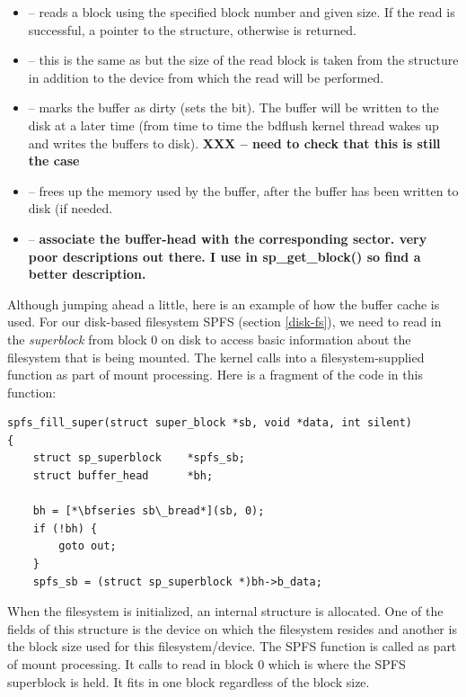 \begin{itemize}
	\item {} -- reads a block using the specified block number and given size. If the read is successful, 
		a pointer to the   structure, otherwise  is returned.
	\item {} -- this is the same as  but the size of the read block 
		is taken from the  structure in addition to the device from which the read will be performed.
	\item {} -- marks the buffer as dirty (sets the  bit). The buffer will be written 
		to the disk at a later time (from time to time the bdflush kernel thread wakes up and writes the buffers 
		to disk). \textbf{XXX -- need to check that this is still the case}
	\item {} --  frees up the memory used by the buffer, after the buffer has been written to disk 
		(if needed.
	\item {} -- \textbf{associate the buffer-head with the corresponding sector. very poor descriptions out there.
		I use in sp\_get\_block() so find a better description.}
\end{itemize}

\noindent
Although jumping ahead a little, here is an example of how the buffer cache is used. For our disk-based filesystem SPFS (section \ref{disk-fs}), we need to read in the \textit{superblock} from block 0 on disk to access basic information about the filesystem that is being mounted. The kernel calls into a filesystem-supplied function as part of mount processing. Here is a fragment of the code in this function:

\begin{lstlisting}
spfs_fill_super(struct super_block *sb, void *data, int silent)
{
    struct sp_superblock    *spfs_sb;
    struct buffer_head      *bh;

    bh = [*\bfseries sb\_bread*](sb, 0);
    if (!bh) {
        goto out;
    }
    spfs_sb = (struct sp_superblock *)bh->b_data;
\end{lstlisting}

\noindent
When the filesystem is initialized, an internal  structure is allocated. One of the fields of this structure is the device on which the filesystem resides and another is the block size used for this filesystem/device. The SPFS  function is called as part of mount processing. It calls  to read in block 0 which is where the SPFS superblock is held. It fits in one block regardless of the block size.

